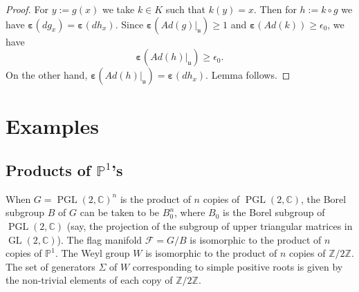 \documentclass[12pt]{amsbook}%
\newtheorem{prop}[thm]{Proposition}
\theoremstyle{definition}
\theoremstyle{remark}
\numberwithin{section}{chapter}
\numberwithin{subsection}{section}
\numberwithin{figure}{chapter}
\DeclareMathOperator{\GL}{GL}
\DeclareMathOperator{\PGL}{PGL}
\DeclareMathOperator{\Opp}{Opp}
\def\eps{\epsilon}
\def\bC{{\mathbb{C}}}
\def\bZ{{\mathbb{Z}}}
\def\bP{{\mathbb{P}}}
\def\cF{{\mathscr{F}}}
\begin{document}
{{\begin{proof}
For $y:=g(x)$ we take $k\in K$ such that $k(y)=x$. Then for $h:= k\circ g$ we have 
$\boldsymbol{\varepsilon}(dg_x)= \boldsymbol{\varepsilon}(dh_x)$. 
Since $\boldsymbol{\varepsilon}(Ad(g)|_{\mathfrak{u}})\geqslant 1$ and 
$\boldsymbol{\varepsilon}(Ad(k))\geqslant\eps_0$, 
 we have
$$
\boldsymbol{\varepsilon}(Ad(h)|_{\mathfrak{u}})\geqslant\eps_0. 
$$
On the other hand,  $\boldsymbol{\varepsilon}(Ad(h)|_{\mathfrak{u}}) =  \boldsymbol{\varepsilon}(dh_x)$.  
Lemma follows. 
\end{proof}


%



\section{Examples}


\subsection{Products of $\bP^1$'s}\label{thickeningsofproductsofprojectivelines}


When $G=\PGL(2,\bC)^n$ is the product of $n$ copies of $\PGL(2,\bC)$, the Borel subgroup $B$ of $G$ can be taken to be 
$B_0^n$, where $B_0$ is the Borel subgroup of $\PGL(2,\bC)$ (say, the projection of the subgroup of 
upper triangular matrices in $\GL(2,\bC)$). The flag manifold $\cF=G/B$ is isomorphic to the product of $n$ copies of $\bP^1$. 
The Weyl group $W$ is isomorphic to the product of $n$ copies of $\bZ/2\bZ$. The set of generators $\Sigma$ of $W$ corresponding to simple positive roots is given by the non-trivial elements of each copy of $\bZ/2\bZ$. 


}}
\end{document}
